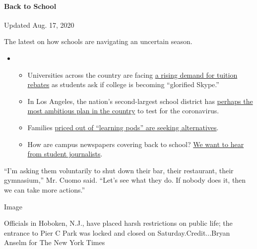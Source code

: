 \hypertarget{back-to-school}{%
\paragraph{Back to School}\label{back-to-school}}

Updated Aug. 17, 2020

The latest on how schools are navigating an uncertain season.

\begin{itemize}
\item
  \begin{itemize}
  \tightlist
  \item
    Universities across the country are facing
    \href{https://www.nytimes3xbfgragh.onion/2020/08/15/us/covid-college-tuition.html?action=click\&pgtype=Article\&state=default\&region=MAIN_CONTENT_3\&context=storylines_keepup}{a
    rising demand for tuition rebates} as students ask if college is
    becoming ``glorified Skype.''
  \item
    In Los Angeles, the nation's second-largest school district has
    \href{https://www.nytimes3xbfgragh.onion/2020/08/16/us/los-angeles-schools-virus-testing.html?action=click\&pgtype=Article\&state=default\&region=MAIN_CONTENT_3\&context=storylines_keepup}{perhaps
    the most ambitious plan in the country} to test for the coronavirus.
  \item
    Families
    \href{https://www.nytimes3xbfgragh.onion/2020/08/14/us/covid-schools-learning-pods.html?action=click\&pgtype=Article\&state=default\&region=MAIN_CONTENT_3\&context=storylines_keepup}{priced
    out of ``learning pods'' are seeking alternatives}.
  \item
    How are campus newspapers covering back to school?
    \href{https://www.nytimes3xbfgragh.onion/2020/08/17/us/student-newspaper-schools-reopening.html?action=click\&pgtype=Article\&state=default\&region=MAIN_CONTENT_3\&context=storylines_keepup}{We
    want to hear from student journalists}.
  \end{itemize}
\end{itemize}

``I'm asking them voluntarily to shut down their bar, their restaurant,
their gymnasium,'' Mr. Cuomo said. ``Let's see what they do. If nobody
does it, then we can take more actions.''

Image

Officials in Hoboken, N.J., have placed harsh restrictions on public
life; the entrance to Pier C Park was locked and closed on
Saturday.Credit...Bryan Anselm for The New York Times

